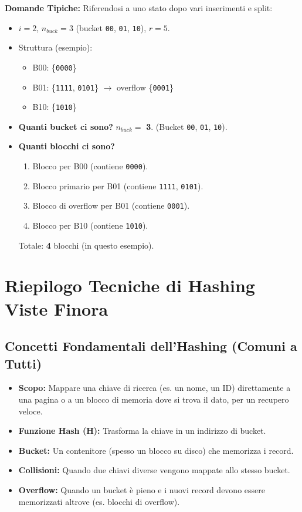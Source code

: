 \textbf{Domande Tipiche:}
Riferendosi a uno stato dopo vari inserimenti e split:
\begin{itemize}
    \item $i=2$, $n_{buck}=3$ (bucket \texttt{00}, \texttt{01}, \texttt{10}), $r=5$.
    \item Struttura (esempio):
    \begin{itemize}
        \item B00: \{\texttt{0000}\}
        \item B01: \{\texttt{1111}, \texttt{0101}\} $\rightarrow$ overflow \{\texttt{0001}\}
        \item B10: \{\texttt{1010}\}
    \end{itemize}
    \item \textbf{Quanti bucket ci sono?} $n_{buck} =$ \textbf{3}. (Bucket \texttt{00}, \texttt{01}, \texttt{10}).
    \item \textbf{Quanti blocchi ci sono?}
    \begin{enumerate}
        \item Blocco per B00 (contiene \texttt{0000}).
        \item Blocco primario per B01 (contiene \texttt{1111}, \texttt{0101}).
        \item Blocco di overflow per B01 (contiene \texttt{0001}).
        \item Blocco per B10 (contiene \texttt{1010}).
    \end{enumerate}
    Totale: \textbf{4} blocchi (in questo esempio).
\end{itemize}
\section{Riepilogo Tecniche di Hashing Viste Finora}

\subsection{Concetti Fondamentali dell'Hashing (Comuni a Tutti)}
\begin{itemize}
    \item \textbf{Scopo:} Mappare una chiave di ricerca (es. un nome, un ID) direttamente a una pagina o a un blocco di memoria dove si trova il dato, per un recupero veloce.
    \item \textbf{Funzione Hash (H):} Trasforma la chiave in un indirizzo di bucket.
    \item \textbf{Bucket:} Un contenitore (spesso un blocco su disco) che memorizza i record.
    \item \textbf{Collisioni:} Quando due chiavi diverse vengono mappate allo stesso bucket.
    \item \textbf{Overflow:} Quando un bucket è pieno e i nuovi record devono essere memorizzati altrove (es. blocchi di overflow).
\end{itemize}

